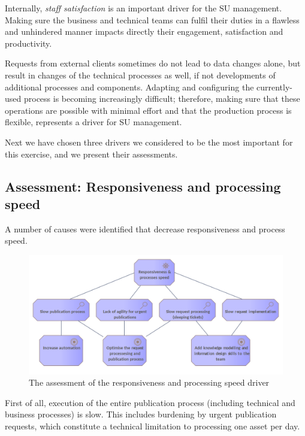 	Internally, \textit{staff satisfaction} is an important driver for the SU management. Making sure the business and technical teams can fulfil their duties in a flawless and unhindered manner impacts directly their engagement, satisfaction and productivity.
	
	Requests from external clients sometimes do not lead to data changes alone, but result in changes of the technical processes as well, if not developments of additional processes and components. Adapting and configuring the currently-used process is becoming increasingly difficult; therefore, making sure that these operations are possible with minimal effort and that the production process is flexible, represents a driver for SU management. 
	
	Next we have chosen three drivers we considered to be the most important for this exercise, and we present their assessments. 
	
	\subsection{Assessment: Responsiveness and processing speed}
	
	A number of causes were identified that decrease responsiveness and process speed. 
	
	\begin{figure}[!h]
		\centering
		\includegraphics[width=\textwidth]{images/motivation/Responsiveless & Process Speed.png}
		\caption{The assessment of the responsiveness and processing speed driver}
		\label{fig:responsiveness-and-processing-speed}
	\end{figure}
	
	First of all, execution of the entire publication process (including technical and business processes) is slow. This includes burdening by urgent publication requests, which constitute a technical limitation to processing one asset per day. 
	
